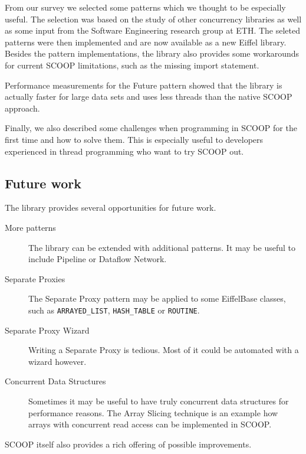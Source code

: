 \documentclass[a4paper,10pt,titlepage]{article}
\begin{document}
From our survey we selected some patterns which we thought to be especially useful.
The selection was based on the study of other concurrency libraries as well as some input from the Software Engineering research group at ETH.
The seleted patterns were then implemented and are now available as a new Eiffel library.
Besides the pattern implementations, the library also provides some workarounds for current SCOOP limitations, such as the missing import statement.

Performance measurements for the Future pattern showed that the library is actually faster for large data sets and uses less threads than the native SCOOP approach.

Finally, we also described some challenges when programming in SCOOP for the first time and how to solve them.
This is especially useful to developers experienced in thread programming who want to try SCOOP out.

\subsection{Future work}

The library provides several opportunities for future work.

\begin{description}
 \item [More patterns] The library can be extended with additional patterns.
 It may be useful to include Pipeline or Dataflow Network.
 \item [Separate Proxies] The Separate Proxy pattern may be applied to some EiffelBase classes, such as \lstinline!ARRAYED_LIST!, \lstinline!HASH_TABLE! or \lstinline!ROUTINE!.
 \item [Separate Proxy Wizard] Writing a Separate Proxy is tedious. Most of it could be automated with a wizard however.
 \item [Concurrent Data Structures] Sometimes it may be useful to have truly concurrent data structures for performance reasons.
The Array Slicing technique \cite{paper:array-slicing} is an example how arrays with concurrent read access can be implemented in SCOOP.
\end{description}

SCOOP itself also provides a rich offering of possible improvements.
\end{document}
